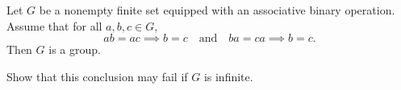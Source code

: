 Let \(G\) be a nonempty finite set equipped with an associative binary operation.
Assume that for all \(a,b,c \in G\),
\[
ab = ac \implies b = c
\quad \text{and} \quad
ba = ca \implies b = c.
\]
Then \(G\) is a group.

Show that this conclusion may fail if \(G\) is infinite.
